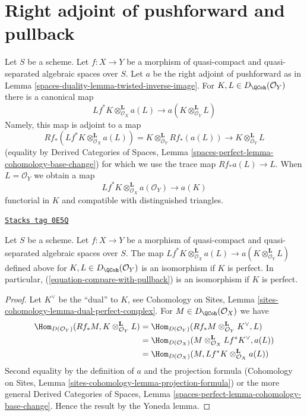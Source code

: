 \section{Right adjoint of pushforward and pullback}
\label{spaces-duality-section-compare-with-pullback}
Let $S$ be a scheme.
Let $f : X \to Y$ be a morphism of quasi-compact and quasi-separated
algebraic spaces over $S$.
Let $a$ be the right adjoint of pushforward as in
Lemma \ref{spaces-duality-lemma-twisted-inverse-image}. For $K, L \in D_\QCoh(\mathcal{O}_Y)$
there is a canonical map
$$
Lf^*K \otimes^\mathbf{L}_{\mathcal{O}_X} a(L)
\longrightarrow
a(K \otimes_{\mathcal{O}_Y}^\mathbf{L} L)
$$
Namely, this map is adjoint to a map
$$
Rf_*(Lf^*K \otimes^\mathbf{L}_{\mathcal{O}_X} a(L)) =
K \otimes^\mathbf{L}_{\mathcal{O}_Y} Rf_*(a(L))
\longrightarrow
K \otimes^\mathbf{L}_{\mathcal{O}_Y} L
$$
(equality by Derived Categories of Spaces, Lemma
\ref{spaces-perfect-lemma-cohomology-base-change})
for which we use the trace map $Rf_*a(L) \to L$.
When $L = \mathcal{O}_Y$ we obtain a map
\begin{equation}
\label{equation-compare-with-pullback}
Lf^*K \otimes^\mathbf{L}_{\mathcal{O}_X} a(\mathcal{O}_Y) \longrightarrow a(K)
\end{equation}
functorial in $K$ and compatible with distinguished triangles.

\begin{lemma}
\label{spaces-duality-lemma-compare-with-pullback-perfect}
\href{https://stacks.math.columbia.edu/tag/0E5Q}{\texttt{Stacks tag 0E5Q}}

Let $S$ be a scheme.
Let $f : X \to Y$ be a morphism of quasi-compact and quasi-separated
algebraic spaces over $S$. The map
$Lf^*K \otimes^\mathbf{L}_{\mathcal{O}_X} a(L) \to
a(K \otimes_{\mathcal{O}_Y}^\mathbf{L} L)$
defined above for $K, L \in D_\QCoh(\mathcal{O}_Y)$
is an isomorphism if $K$ is perfect. In particular,
(\ref{equation-compare-with-pullback}) is an isomorphism if $K$ is perfect.
\end{lemma}

\begin{proof}
Let $K^\vee$ be the ``dual'' to $K$, see
Cohomology on Sites, Lemma \ref{sites-cohomology-lemma-dual-perfect-complex}.
For $M \in D_\QCoh(\mathcal{O}_X)$ we have
\begin{align*}
\Hom_{D(\mathcal{O}_Y)}(Rf_*M, K \otimes^\mathbf{L}_{\mathcal{O}_Y} L)
& =
\Hom_{D(\mathcal{O}_Y)}(
Rf_*M \otimes^\mathbf{L}_{\mathcal{O}_Y} K^\vee, L) \\
& =
\Hom_{D(\mathcal{O}_X)}(
M \otimes^\mathbf{L}_{\mathcal{O}_X} Lf^*K^\vee, a(L)) \\
& =
\Hom_{D(\mathcal{O}_X)}(M,
Lf^*K \otimes^\mathbf{L}_{\mathcal{O}_X} a(L))
\end{align*}
Second equality by the definition of $a$ and the projection formula
(Cohomology on Sites, Lemma
\ref{sites-cohomology-lemma-projection-formula})
or the more general Derived Categories of Spaces, Lemma
\ref{spaces-perfect-lemma-cohomology-base-change}.
Hence the result by the Yoneda lemma.
\end{proof}

